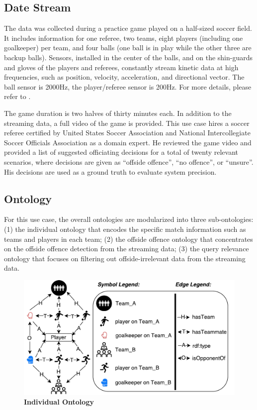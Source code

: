 \subsection{Date Stream}
The data was collected during a practice game played on a half-sized soccer field. 
It includes information for one referee, two teams, eight players (including one goalkeeper) per team, and four balls (one ball is in play while the other three are backup balls). 
Sensors, installed in the center of the balls, and on the shin-guards and gloves of the players and referees, constantly stream kinetic data at high frequencies, such as position, velocity, acceleration, and directional vector. 
The ball sensor is 2000Hz, the player/referee sensor is 200Hz.
For more details, please refer to \cite{mutschler2013debs}.

The game duration is two halves of thirty minutes each.
In addition to the streaming data, a full video of the game is provided. 
This use case hires a soccer referee certified by United States Soccer Association and National Intercollegiate Soccer Officials Association as a domain expert.
He reviewed the game video and provided a list of suggested officiating decisions for a total of twenty relevant scenarios, where decisions are given as ``offside offence'', ``no offence'', or ``unsure''.
His decisions are used as a ground truth to evaluate system precision.
%
\subsection{Ontology}
For this use case, the overall ontologies are modularized into three sub-ontologies:
(1) the individual ontology that encodes the specific match information such as teams and players in each team;
(2) the offside offence ontology that concentrates on the offside offence detection from the streaming data;
(3) the query relevance ontology that focuses on filtering out offside-irrelevant data from the streaming data.

\begin{figure}[!htbp]
	\centering
	\includegraphics[width=5in]{img/5-matchOnto}
	\caption{\textbf{Individual Ontology}}
	\label{fig:matchOnto}
\end{figure}

